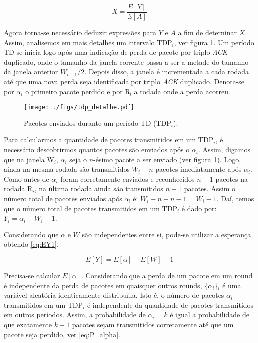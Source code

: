 \begin{equation} \label{eq:throughput}
\overline{X}=\frac{E[Y]}{E[A]}
\end{equation}

Agora torna-se necessário deduzir expressões para $Y$ e $A$ a fim de deterninar $\overline{X}$. Assim, 
analisemos em mais detalhes um intervalo TDP$_i$, ver figura \ref{fig:tdp_detalhe}.
Um período TD se inicia logo após uma indicação de perda de pacote por triplo \textit{ACK} duplicado, 
onde o tamanho da janela corrente passa a ser a metade do tamanho da janela anterior $W_{i-1} / 2$. 
Depois disso, a janela é incrementada a cada rodada até que uma nova perda seja identificada por triplo 
\textit{ACK} duplicado. Denota-se por $\alpha_i$ o primeiro pacote perdido e por R$_i$ a rodada onde a 
perda acorreu. 

\begin{figure}[ht]
  \centering
  \texttt{[image: ./figs/tdp\_detalhe.pdf]}
  \caption{Pacotes enviados durante um período TD (TDP$_{i}$).}
  \label{fig:tdp_detalhe}
\end{figure}

Para calcularmos a quantidade de pacotes transmitidos em um TDP$_i$, é necessário descobrirmos quantos pacotes
são enviados após o $\alpha_i$. Assim, digamos que na janela W$_i$, $\alpha_i$ seja o $n$-ésimo pacote a ser
enviado (ver figura \ref{fig:tdp_detalhe}). Logo, ainda na mesma rodada  são transmitidos $W_i - n$ pacotes 
imediatamente após $\alpha_i$. Como antes de $\alpha_i$ foram corretamente enviados e reconhecidos $n - 1$ pacotes 
na rodada R$_i$, na última rodada ainda são transmitidos $n - 1$ pacotes. Assim o número total de pacotes enviados
após $\alpha_i$ é: $W_i - n + n -1 = W_i - 1$. Daí, temos que o número total de pacotes transmitidos em um
TDP$_i$ é dado por: $Y_i = \alpha_i + W_i - 1$. 

Considerando que $\alpha$ e $W$ são independentes entre si,
pode-se utilizar a esperança obtendo \eqref{eq:EY1}.

\begin{equation} \label{eq:EY1}
E[Y]=E[\alpha] + E[W] - 1
\end{equation}

Precisa-se calcular $E[\alpha]$. Considerando que a perda de um pacote em um round é independente da perda de 
pacotes em quaisquer outros rounds, \{$\alpha_i$\}$_i$ é uma variável aleatória identicamente distribuída. 
Isto é, o número de pacotes $\alpha_i$ transmitidos em um TDP$_i$ é independente da quantidade de pacotes
transmitidos em outros períodos. Assim, a probabilidade de $\alpha_i = k$ é igual a probabilidade de que
exatamente $k - 1$ pacotes sejam transmitidos corretamente até que um pacote seja perdido, ver 
\eqref{eq:P_alpha}.

